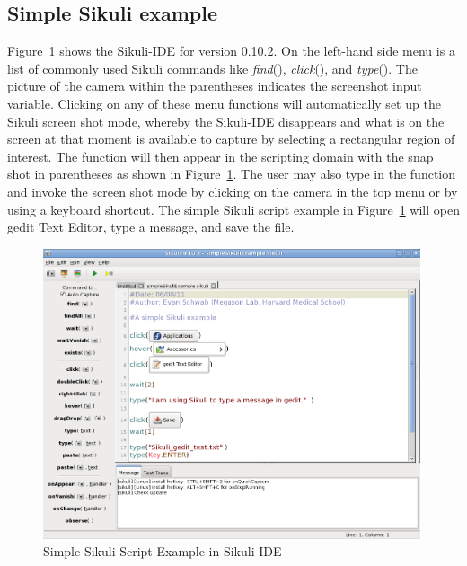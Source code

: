 \documentclass{InsightArticle}
\begin{document}
\subsection{Simple Sikuli example} %
\label{sec:SimpleSikuliExample}

Figure~\ref{fig:SimpleExample} shows the Sikuli-IDE for version 0.10.2. On the
left-hand side menu is a list of commonly used Sikuli commands
like \emph{find}(), \emph{click}(), and \emph{type}(). The picture of
the camera within the parentheses indicates the screenshot input variable.
Clicking on any of these menu functions will automatically set up the Sikuli
screen shot mode, whereby the Sikuli-IDE disappears and what is on the screen at
that moment is available to capture by selecting a rectangular region of
interest. The function will then appear in the scripting domain with the snap
shot in parentheses as shown in Figure~\ref{fig:SimpleExample}. The user may
also type in the function and invoke the screen shot mode by clicking on the
camera in the top menu or by using a keyboard shortcut. The simple Sikuli script
example in Figure~\ref{fig:SimpleExample} will open gedit Text Editor, type a
message, and save the file.

\begin{figure}[tbp]
 \centering
 \includegraphics[width=0.99\textwidth]{Images/SimpleSikuliExample.png}
 \caption{Simple Sikuli Script Example in Sikuli-IDE}
 \label{fig:SimpleExample}
\end{figure}
\end{document}
